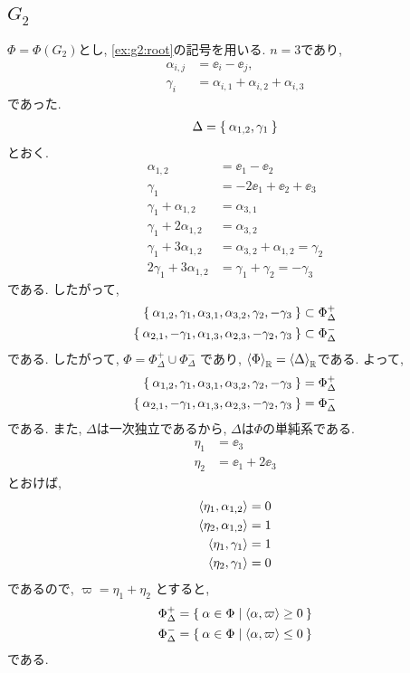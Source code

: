 \subsection{$G_2$}
\label{ex:g2:simple}
$\Phi=\Phi(G_2)$とし,
\cref{ex:g2:root}の記号を用いる.
$n=3$であり,
\begin{align*}
  \alpha_{i,j}&=\ee_i-\ee_j,\\
  \gamma_{i}&=\alpha_{i,1}+\alpha_{i,2}+\alpha_{i,3}
\end{align*}
であった.
\begin{align*}
  \Delta=\Set{\alpha_{1,2},\gamma_{1}}
\end{align*}
とおく.
\begin{align*}
  \alpha_{1,2}&=\ee_1-\ee_2\\
  \gamma_{1}&=-2\ee_1+\ee_2+\ee_3\\
  \gamma_{1}+\alpha_{1,2}&=\alpha_{3,1}\\
  \gamma_{1}+2\alpha_{1,2}&=\alpha_{3,2}\\
  \gamma_{1}+3\alpha_{1,2}&=\alpha_{3,2}+\alpha_{1,2}=\gamma_{2}\\
  2\gamma_{1}+3\alpha_{1,2}&=\gamma_1+\gamma_{2}=-\gamma_3
\end{align*}
である.  したがって,
\begin{align*}
\Set{ \alpha_{1,2},\gamma_{1}, \alpha_{3,1},\alpha_{3,2},\gamma_{2},-\gamma_3}
&\subset
  \Phi_\Delta^+\\
\Set{ \alpha_{2,1},-\gamma_{1}, \alpha_{1,3},\alpha_{2,3},-\gamma_{2},\gamma_3}
&\subset
  \Phi_\Delta^-
\end{align*}
である.
したがって, $\Phi=\Phi_\Delta^+\cup\Phi_\Delta^-$
であり,
$\Braket{\Phi}_{\mathbb{R}}=\Braket{\Delta}_{\mathbb{R}}$である.
よって, 
\begin{align*}
\Set{ \alpha_{1,2},\gamma_{1}, \alpha_{3,1},\alpha_{3,2},\gamma_{2},-\gamma_3}
&=
  \Phi_\Delta^+\\
\Set{ \alpha_{2,1},-\gamma_{1}, \alpha_{1,3},\alpha_{2,3},-\gamma_{2},\gamma_3}
&=
  \Phi_\Delta^-
\end{align*}
である.
また, $\Delta$は一次独立であるから,
$\Delta$は$\Phi$の単純系である.
\begin{align*}
  \eta_1&=\ee_3\\
  \eta_2&=\ee_1+2\ee_3
\end{align*}
とおけば,
\begin{align*}
  \Braket{\eta_1,\alpha_{1,2}}&=0\\
  \Braket{\eta_2,\alpha_{1,2}}&=1\\
  \Braket{\eta_1,\gamma_{1}}&=1\\
  \Braket{\eta_2,\gamma_{1}}&=0\\
\end{align*}
であるので, $\varpi=\eta_1+\eta_2$
  とすると,
\begin{align*}
\Phi_\Delta^+&=\Set{\alpha\in\Phi|\Braket{\alpha,\varpi}\geq 0}\\
\Phi_\Delta^-&=\Set{\alpha\in\Phi|\Braket{\alpha,\varpi}\leq 0}
\end{align*}
である.

